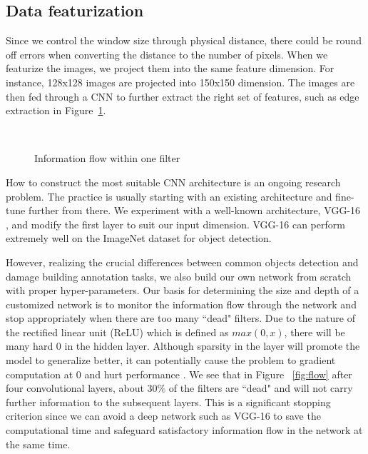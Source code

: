 \documentclass[journal, 12pt, onecolumn,draftclsnofoot]{IEEEtran}
\begin{document}
\subsection{Data featurization}\label{sec:featurization}
Since we control the window size through physical distance, there could be round off errors when converting the distance to the number of pixels. When we featurize the images, we project them into the same feature dimension. For instance, 128x128 images are projected into 150x150 dimension. The images are then fed through a CNN to further extract the right set of features, such as edge extraction in Figure~\ref{fig:one_filter}.

\begin{figure}[h]{\centering
{}
\\
\caption{\small{Information flow within one filter}}
\label{fig:one_filter}
}
\end{figure}

How to construct the most suitable CNN architecture is an ongoing research problem. The practice is usually starting with an existing architecture and fine-tune further from there. We experiment with a well-known architecture, VGG-16 \cite{vgg16}, and modify the first layer to suit our input dimension. VGG-16 can perform extremely well on the ImageNet dataset for object detection. 

However, realizing the crucial differences between common objects detection and damage building annotation tasks, we also build our own network from scratch with proper hyper-parameters. Our basis for determining the size and depth of a customized network is to monitor the information flow through the network and stop appropriately when there are too many ``dead" filters. Due to the nature of the rectified linear unit (ReLU) which is defined as $max(0,x)$, there will be many hard 0 in the hidden layer. Although sparsity in the layer will promote the model to generalize better, it can potentially cause the problem to gradient computation at 0 and hurt performance \cite{relu,leaky}. We see that in Figure ~\ref{fig:flow} after four convolutional layers, about 30\% of the filters are ``dead" and will not carry further information to the subsequent layers. This is a significant stopping criterion since we can avoid a deep network such as VGG-16 to save the computational time and safeguard satisfactory information flow in the network at the same time. 
\end{document}
